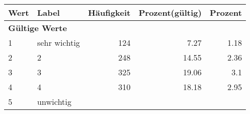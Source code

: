      \begin{longtable}{lXrrr}
     \toprule
     \textbf{Wert} & \textbf{Label} & \textbf{Häufigkeit} & \textbf{Prozent(gültig)} & \textbf{Prozent} \\
     \endhead
     \midrule
     \multicolumn{5}{l}{\textbf{Gültige Werte}}\\

     1 &
     \multicolumn{1}{X}{ sehr wichtig   } &


       \num{124} &
       \num[round-mode=places,round-precision=2]{7,27} &
         \num[round-mode=places,round-precision=2]{1,18} \\

     2 &
     \multicolumn{1}{X}{ 2   } &


       \num{248} &
       \num[round-mode=places,round-precision=2]{14,55} &
         \num[round-mode=places,round-precision=2]{2,36} \\

     3 &
     \multicolumn{1}{X}{ 3   } &


       \num{325} &
       \num[round-mode=places,round-precision=2]{19,06} &
         \num[round-mode=places,round-precision=2]{3,1} \\

     4 &
     \multicolumn{1}{X}{ 4   } &


       \num{310} &
       \num[round-mode=places,round-precision=2]{18,18} &
         \num[round-mode=places,round-precision=2]{2,95} \\

     5 &
     \multicolumn{1}{X}{ unwichtig   } &



\end{longtable}

